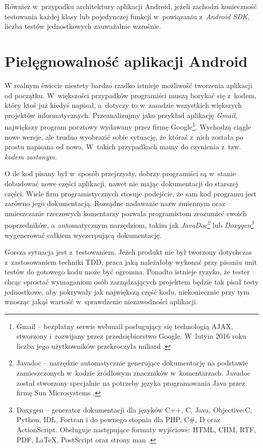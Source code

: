 Również w~przypadku architektury aplikacji Android, jeżeli zachodzi konieczność testowania każdej klasy lub pojedynczej funkcji w~powiązaniu z~\textit{Android SDK}, liczba testów jednostkowych zauważalnie wzrośnie.

\section{Pielęgnowalność aplikacji Android}
\label{pielegnowalnosc_aplikacji}
W realnym świecie niestety bardzo rzadko istnieje możliwość tworzenia aplikacji od początku. W~większości przypadków programiści muszą borykać się z~kodem, który ktoś już kiedyś napisał, a~dotyczy to w~zasadzie wszystkich większych projektów informatycznych. Przeanalizujmy jako przykład  aplikację \textit{Gmail}, największy program pocztowy wydawany przez firmę Google\footnote{Gmail – bezpłatny serwis webmail posługujący się technologią AJAX, stworzony i~rozwijany przez przedsiębiorstwo Google. W~lutym 2016 roku liczba jego użytkowników przekroczyła miliard \cite{website:wikipedia}.}. Wychodzą ciągle nowe wersje, ale trudno wyobrazić sobie sytuację, że któraś z~nich została po prostu napisana od nowa. W~takich przypadkach mamy do czynienia z~tzw. \textit{kodem zastanym}.

O ile kod pisany był w~sposób przejrzysty, dobrzy programiści są w~stanie dobudować nowe części aplikacji, nawet nie mając dokumentacji do starszej części. Wiele firm programistycznych stosuje podejście, że sam kod programu jest zarówno jego dokumentacją. Rozsądne nadawanie nazw zmiennym oraz umieszczanie rzeczowych komentarzy pozwala programistom zrozumieć swoich poprzedników, a~automatycznym narzędziom, takim jak \textit{JavaDoc\footnote{Javadoc – narzędzie automatycznie generujące dokumentację na podstawie zamieszczonych w~kodzie źródłowym znaczników w~komentarzach. Javadoc został stworzony specjalnie na potrzeby języka programowania Java przez firmę Sun Microsystems \cite{website:wikipedia}.}} lub \textit{Doxygen\footnote{Doxygen – generator dokumentacji dla języków C++, C, Java, Objective-C, Python, IDL, Fortran i do pewnego stopnia dla PHP, C\#, D oraz ActionScript. Obsługuje następujące formaty wyjściowe: HTML, CHM, RTF, PDF, LaTeX, PostScript oraz strony man \cite{website:wikipedia}.}} wygenerować całkiem wyczerpującą dokumentację.

Gorsza sytuacja jest z~testowaniem. Jeżeli produkt nie był tworzony dotychczas z~zastosowaniem techniki TDD, praca jaką należałoby wykonać przy pisaniu unit testów do gotowego kodu może być ogromna. Ponadto istnieje ryzyko, że tester chcąc sprostać wymaganiom osób zarządzających projektem będzie tak pisał testy jednostkowe, aby pokrywały jak największą część kodu, niekoniecznie przy tym wnosząc jakąś wartość w~sprawdzenie niezawodności aplikacji.

